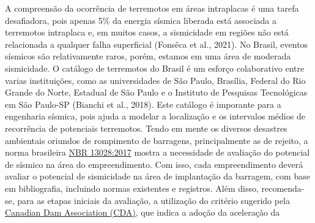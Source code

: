 \documentclass[10pt,a4paper,oneside]{book}
\begin{document}
A compreensão da ocorrência de terremotos em áreas intraplacas é uma tarefa desafiadora, pois apenas 5\% da energia sísmica liberada está associada a terremotos intraplaca e, em muitos casos, a sismicidade em regiões não está relacionada a qualquer falha superficial (Fonsêca et al., 2021). No Brasil, eventos sísmicos são relativamente raros, porém, estamos em uma área de moderada sismicidade. O catálogo de terremotos do Brasil é um esforço colaborativo entre varias instituições, como as universidades de São Paulo, Brasília, Federal do Rio Grande do Norte, Estadual de São Paulo e o Instituto de Pesquisas Tecnológicas em São Paulo-SP (Bianchi et al., 2018). Este catálogo é imporante para a engenharia sísmica, pois ajuda a modelar a localização e os intervalos médios de recorrência de potenciais terremotos. Tendo em mente os diversos desastres ambientais oriundos de rompimento de barragens, principalmente as de rejeito, a norma brasileira \href{https://pdfcoffee.com/download/nbr-13028-pdf-free.html}{NBR 13028:2017} mostra a necessidade de avaliação do potencial de sísmico na área do empreendimento. Com isso, cada empreendimento deverá avaliar o potencial de sismicidade na área de implantação da barragem, com base em bibliografia, incluindo normas existentes e registros. Além disso, recomenda-se, para as etapas iniciais da avaliação, a utilização do critério sugerido pela \href{https://www.knightpiesold.com/sites/en/assets/File/CDA\%202016\%20-\%20Seismic\%20and\%20Structural\%20Stability\%20Analysis\%20for\%20Increased\%20Ground\%20Motions\%20at\%20the\%20Corra\%20Linn\%20Dam.pdf}{Canadian Dam Association (CDA)}, que indica a adoção da aceleração da
\end{document}
